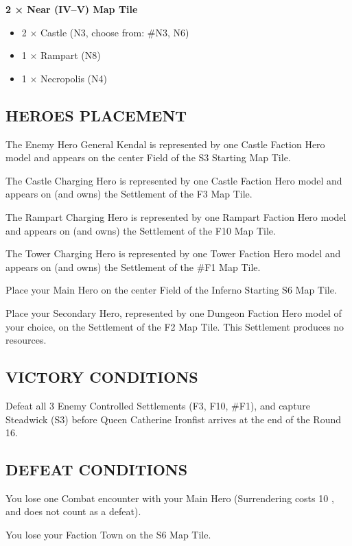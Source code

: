 \begin{multicols*}{2}
\textbf{2 × Near (IV--V) Map Tile}
\begin{itemize}
  \item 2 × Castle (N3, choose from: \#N3, N6)
  \item 1 × Rampart (N8)
  \item 1 × Necropolis (N4)
\end{itemize}

\subsection*{\MakeUppercase{Heroes Placement}}

The Enemy Hero General Kendal is represented by one Castle Faction Hero model and appears on the center Field of the S3 Starting Map Tile.

The Castle Charging Hero is represented by one Castle Faction Hero model and appears on (and owns) the Settlement of the F3 Map Tile.

The Rampart Charging Hero is represented by one Rampart Faction Hero model and appears on (and owns) the Settlement of the F10 Map Tile.

The Tower Charging Hero is represented by one Tower Faction Hero model and appears on (and owns) the Settlement of the \#F1 Map Tile.

Place your Main Hero on the center Field of the Inferno Starting S6 Map Tile.

Place your Secondary Hero, represented by one Dungeon Faction Hero model of your choice, on the Settlement of the F2 Map Tile. This Settlement produces no resources.

\subsection*{\MakeUppercase{Victory Conditions}}

Defeat all 3 Enemy Controlled Settlements (F3, F10, \#F1), and capture Steadwick (S3) before
Queen Catherine Ironfist arrives at the end of the Round 16.

\subsection*{\MakeUppercase{Defeat Conditions}}

You lose one Combat encounter with your Main Hero (Surrendering costs 10 , and does not count as a defeat).

You lose your Faction Town on the S6 Map Tile.


\end{multicols*}
